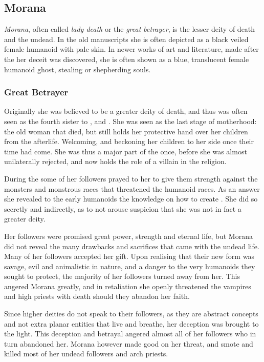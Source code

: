 \subsection{Morana}
\label{sec:Morana}

\emph{Morana}, often called \emph{lady death} or the \emph{great betrayer}, is
the lesser deity of death and the undead. In the old manuscripts she is often
depicted as a black veiled female humanoid with pale skin. In newer works of
art and literature, made after the her deceit was discovered, she is often
shown as a blue, translucent female humanoid ghost, stealing or shepherding
souls.

\subsubsection{Great Betrayer}
\label{sec:Great Betrayer}

Originally she was believed to be a greater deity of death, and thus was often
seen as the fourth sister to ,  and
. She was seen as the last stage of motherhood: the old
woman that died, but still holds her protective hand over her children from
the afterlife. Welcoming, and beckoning her children to her side once their
time had come. She was thus a major part of the  once,
before she was almost unilaterally rejected, and now holds the role of a
villain in the religion.

During the  some of her followers prayed to her to
give them strength against the monsters and monstrous races that threatened
the humanoid races. As an answer she revealed to the early humanoids the
knowledge on how to create . She did so secretly and
indirectly, as to not arouse suspicion that she was not in fact a greater
deity.

Her followers were promised great power, strength and eternal life, but Morana
did not reveal the many drawbacks and sacrifices that came with the undead
life. Many of her followers accepted her gift. Upon realising that their new
form was savage, evil and animalistic in nature, and a danger to the very
humanoids they sought to protect, the majority of her followers turned away
from her. This angered Morana greatly, and in retaliation she openly
threatened the vampires and high priests with death should they abandon her
faith.

Since higher deities do not speak to their followers, as they are abstract
concepts and not extra planar entities that live and breathe, her deception
was brought to the light. This deception and betrayal angered almost all of
her followers who in turn abandoned her. Morana however made good on her
threat, and smote and killed most of her undead followers and arch priests.

